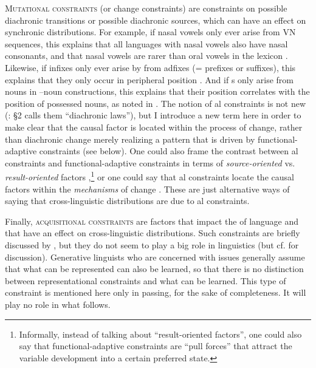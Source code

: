 \documentclass[output=paper]{langsci/langscibook}
\begin{document}
\textsc{Mutational constraints} (or change constraints) are constraints on possible diachronic transitions or possible diachronic sources, which can have an effect on synchronic distributions. For example, if nasal vowels only ever arise from VN sequences, this explains that all languages with nasal vowels also have nasal consonants, and that nasal vowels are rarer than oral vowels in the lexicon \citep{Greenberg1978_Diachr}. Likewise, if infixes only ever arise by  from adfixes (= prefixes or suffixes), this explains that they only occur in peripheral position \citep[51]{Plank2007}. And if s only arise from nouns in –noun constructions, this explains that their position correlates with the position of possessed nouns, as noted in . The notion of al constraints is not new (\citealt{Plank2007}: §2 calls them “diachronic laws”), but I introduce a new term here in order to make clear that the causal factor is located within the process of change, rather than diachronic change merely realizing a pattern that is driven by functional-adaptive constraints (see  below). One could also frame the contrast between al constraints and functional-adaptive constraints in terms of \textit{source-oriented} vs. \textit{result-oriented} factors \citep{Cristofaro2017},\footnote{Informally, instead of talking about “result-oriented factors”, one could also say that functional-adaptive constraints are “pull forces” that attract the variable development into a certain preferred state.} or one could say that al constraints locate the causal factors within the \textit{mechanisms} of change \citep{Bybee2006}. These are just alternative ways of saying that cross-linguistic distributions are due to al constraints.

\largerpage
Finally, \textsc{acquisitional constraints} are factors that impact the  of language and that have an effect on cross-linguistic distributions. Such constraints are briefly discussed by \citet{Anderson2016}, but they do not seem to play a big role in linguistics (but cf.  for discussion). Generative linguists who are concerned with  issues generally assume that what can be represented can also be learned, so that there is no distinction between representational constraints and what can be learned. This type of constraint is mentioned here only in passing, for the sake of completeness. It will play no role in what follows.
\end{document}

